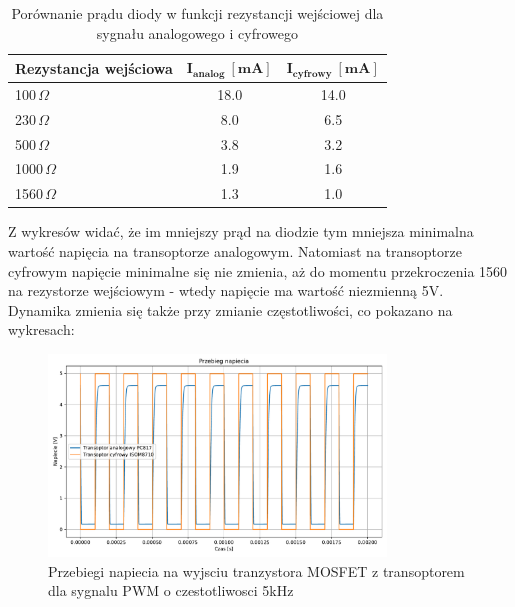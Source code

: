 \documentclass[11pt]{article}
\begin{document}
\begin{table}[H]
\centering
\begin{tabular}{|l|c|c|}
\hline
\textbf{Rezystancja wejściowa} & \(\mathbf{I_{analog} \ [mA]}\) & \(\mathbf{I_{cyfrowy} \ [mA]}\) \\
\hline
100\,$\Omega$ & 18.0 & 14.0 \\
\hline
230\,$\Omega$ & 8.0 & 6.5 \\
\hline
500\,$\Omega$ & 3.8 & 3.2 \\
\hline
1000\,$\Omega$ & 1.9 & 1.6 \\
\hline
1560\,$\Omega$ & 1.3 & 1.0 \\
\hline
\end{tabular}
\caption{Porównanie prądu diody w funkcji rezystancji wejściowej dla sygnału analogowego i cyfrowego}
\label{tab:diode_current_comparison}
\end{table}

Z wykresów widać, że im mniejszy prąd na diodzie tym mniejsza minimalna wartość napięcia na transoptorze analogowym. Natomiast na transoptorze cyfrowym napięcie minimalne się nie zmienia, aż do momentu przekroczenia 1560 \Omega na rezystorze wejściowym - wtedy napięcie ma wartość niezmienną 5V. \\

Dynamika zmienia się także przy zmianie częstotliwości, co pokazano na wykresach: \\

\begin{figure}[H]
\centering
\includegraphics[width=0.8\textwidth]{aun1_gate_circuit_digital_vs_analog_5khz.pdf}
\caption{Przebiegi napiecia na wyjsciu tranzystora MOSFET z transoptorem dla sygnalu PWM o czestotliwosci 5kHz}
\end{figure}
\end{document}
